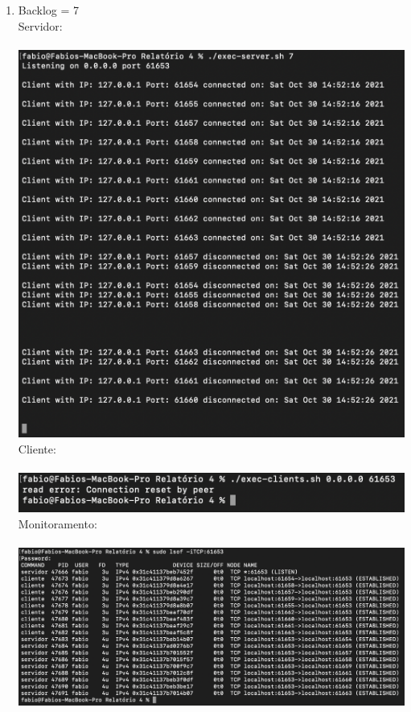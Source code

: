 \documentclass[12pt,a4paper]{report}
\begin{document}
\begin{enumerate}
\begin{enumerate}
        \item Backlog = 7\\
        Servidor:\\\\
        \includegraphics[width=1\textwidth]{images/servidor-backlog-7.png}
        Cliente:\\\\
        \includegraphics[width=1\textwidth]{images/cliente-backlog-7.png}
        Monitoramento:\\\\
        \includegraphics[width=1\textwidth]{images/lsof-backlog-7.png}
        

\end{enumerate}
\end{enumerate}
\end{document}
